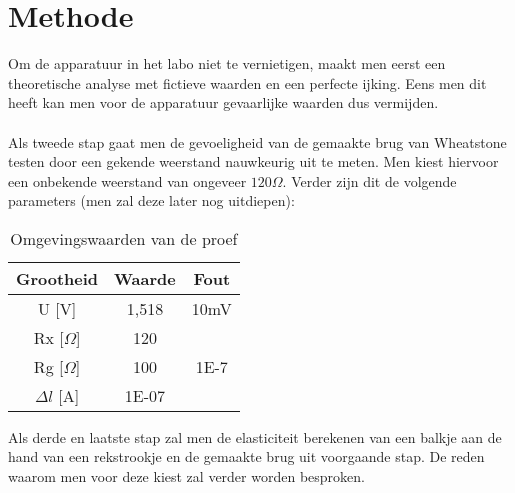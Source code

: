 \section{Methode}

Om de apparatuur in het labo niet te vernietigen, maakt men
eerst een theoretische analyse met fictieve waarden en een 
perfecte ijking. Eens men dit heeft kan men voor de apparatuur
gevaarlijke waarden dus vermijden.
\\ \\
Als tweede stap gaat men de gevoeligheid van de gemaakte brug
van Wheatstone testen door een gekende weerstand nauwkeurig uit
te meten. Men kiest hiervoor een onbekende weerstand van
ongeveer $120 \Omega$. Verder zijn dit de volgende parameters
(men zal deze later nog uitdiepen):

\begin{table}[h]
    \caption{Omgevingswaarden van de proef}
    \label{tab:omgevingswaarden}
    \centering
    \begin{tabular}{| c | c | c |}
        \hline
        Grootheid       & Waarde    & Fout \\ \hline
        U [V]           & 1,518     & 10mV \\ \hline
        Rx [$\Omega$]   & 120       &      \\ \hline
        Rg [$\Omega$]   & 100       & 1E-7 \\ \hline
        $\Delta l$ [A]  & 1E-07     &      \\ \hline
    \end{tabular}
\end{table}

Als derde en laatste stap zal men de elasticiteit berekenen van
een balkje aan de hand van een rekstrookje en de gemaakte brug
uit voorgaande stap. De reden waarom men voor deze kiest zal
verder worden besproken.
